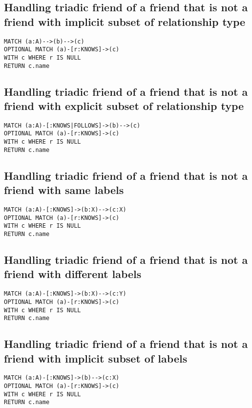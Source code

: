\subsection{Handling triadic friend of a friend that is not a friend with implicit subset of relationship type}

\begin{lstlisting}
MATCH (a:A)-->(b)-->(c)
OPTIONAL MATCH (a)-[r:KNOWS]->(c)
WITH c WHERE r IS NULL
RETURN c.name
\end{lstlisting}

\subsection{Handling triadic friend of a friend that is not a friend with explicit subset of relationship type}

\begin{lstlisting}
MATCH (a:A)-[:KNOWS|FOLLOWS]->(b)-->(c)
OPTIONAL MATCH (a)-[r:KNOWS]->(c)
WITH c WHERE r IS NULL
RETURN c.name
\end{lstlisting}

\subsection{Handling triadic friend of a friend that is not a friend with same labels}

\begin{lstlisting}
MATCH (a:A)-[:KNOWS]->(b:X)-->(c:X)
OPTIONAL MATCH (a)-[r:KNOWS]->(c)
WITH c WHERE r IS NULL
RETURN c.name
\end{lstlisting}

\subsection{Handling triadic friend of a friend that is not a friend with different labels}

\begin{lstlisting}
MATCH (a:A)-[:KNOWS]->(b:X)-->(c:Y)
OPTIONAL MATCH (a)-[r:KNOWS]->(c)
WITH c WHERE r IS NULL
RETURN c.name
\end{lstlisting}

\subsection{Handling triadic friend of a friend that is not a friend with implicit subset of labels}

\begin{lstlisting}
MATCH (a:A)-[:KNOWS]->(b)-->(c:X)
OPTIONAL MATCH (a)-[r:KNOWS]->(c)
WITH c WHERE r IS NULL
RETURN c.name
\end{lstlisting}

